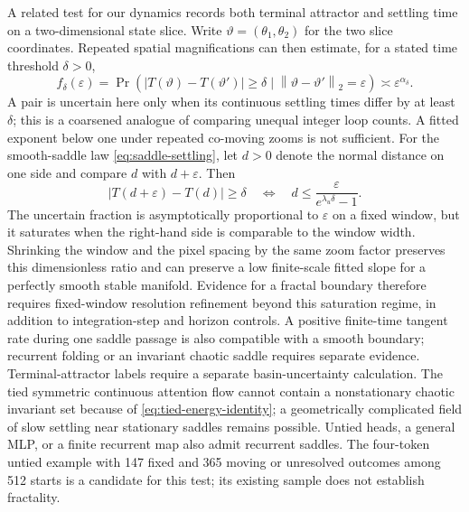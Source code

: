 \documentclass[11pt,a4paper]{article}
\theoremstyle{definition}
\newcommand{\norm}[1]{\left\lVert #1\right\rVert}
\begin{document}
A related test for our dynamics records both terminal attractor and settling time on
a two-dimensional state slice.  Write $\vartheta=(\theta_1,\theta_2)$ for
the two slice coordinates.  Repeated spatial magnifications can then estimate, for a
stated time threshold $\delta>0$,
\begin{equation}
 f_\delta(\varepsilon)=
 \Pr\!\left(|T(\vartheta)-T(\vartheta')|\geq\delta
 \mid\norm{\vartheta-\vartheta'}_2=\varepsilon\right)
 \asymp\varepsilon^{\alpha_\delta}.
 \label{eq:uncertainty-exponent}
\end{equation}
A pair is uncertain here only when its continuous settling times differ by at least
$\delta$; this is a coarsened analogue of comparing unequal integer loop counts.
A fitted exponent below one under repeated co-moving zooms is not sufficient.  For
the smooth-saddle law \eqref{eq:saddle-settling}, let $d>0$ denote the normal distance
on one side and compare $d$ with $d+\varepsilon$.  Then
\begin{equation}
 |T(d+\varepsilon)-T(d)|\geq\delta
 \quad\Longleftrightarrow\quad
 d\leq \frac{\varepsilon}{e^{\lambda_u\delta}-1}.
 \label{eq:smooth-saddle-null}
\end{equation}
The uncertain fraction is asymptotically proportional to $\varepsilon$ on a fixed
window, but it saturates when the right-hand side is comparable to the window width.
Shrinking the window and the pixel spacing by the same zoom factor preserves this
dimensionless ratio and can preserve a low finite-scale fitted slope for a perfectly
smooth stable manifold.  Evidence for a fractal boundary therefore requires
fixed-window resolution refinement beyond this saturation regime, in addition to
integration-step and horizon controls.  A positive finite-time tangent rate during
one saddle passage is also compatible with a smooth boundary; recurrent folding or
an invariant chaotic saddle requires separate evidence.  Terminal-attractor labels
require a separate basin-uncertainty calculation.  The tied symmetric continuous attention flow cannot contain a
nonstationary chaotic invariant set because of \eqref{eq:tied-energy-identity}; a
geometrically complicated field of slow settling near stationary saddles remains
possible.  Untied heads, a general MLP, or a finite recurrent map also admit recurrent
saddles.  The four-token untied example with 147 fixed and 365 moving or unresolved
outcomes among 512 starts is a candidate for this test; its existing sample does not
establish fractality.
\end{document}
